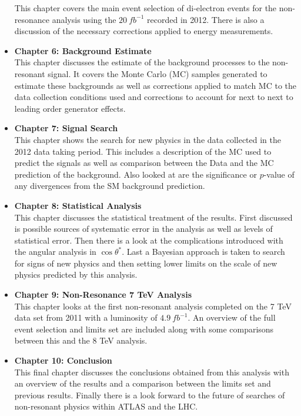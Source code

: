 \begin{itemize}
{This chapter covers the main event selection of di-electron events for the non-resonance analysis using the $20~fb^{-1}$ recorded in 2012. There is also a discussion of the necessary corrections applied to energy measurements.
}
\item{ 
{\bf Chapter 6: Background Estimate} \\
This chapter discusses the estimate of the background processes to the non-resonant signal. It covers the Monte Carlo (MC) samples generated to estimate these backgrounds as well as corrections applied to match MC to the data collection conditions used and corrections to account for next to next to leading order generator effects.
}
\item{ 
{\bf Chapter 7: Signal Search} \\
This chapter shows the search for new physics in the data collected in the 2012 data taking period. This includes a description of the MC used to predict the signals as well as comparison between the Data and the MC prediction of the background. Also looked at are the significance or $p$-value of any divergences from the SM background prediction.
}
\item{ 
{\bf Chapter 8: Statistical Analysis} \\
This chapter discusses the statistical treatment of the results. First discussed is possible sources of systematic error in the analysis as well as levels of statistical error. Then there is a look at the complications introduced with the angular analysis in $\cos\theta^{*}$. Last a Bayesian approach is taken to search for signs of new physics and then setting lower limits on the scale of new physics predicted by this analysis.
}
\item{ 
{\bf Chapter 9: Non-Resonance 7 TeV Analysis} \\
This chapter looks at the first non-resonant analysis completed on the 7 TeV data set from 2011 with a luminosity of $4.9~fb^{-1}$. An overview of the full event selection and limits set are included along with some comparisons between this and the 8 TeV analysis. 
}
\item{ 
{\bf Chapter 10: Conclusion} \\
This final chapter discusses the conclusions obtained from this analysis with an overview of the results and a comparison between the limits set and previous results. Finally there is a look forward to the future of searches of non-resonant physics within ATLAS and the LHC.
}
\end{itemize}







